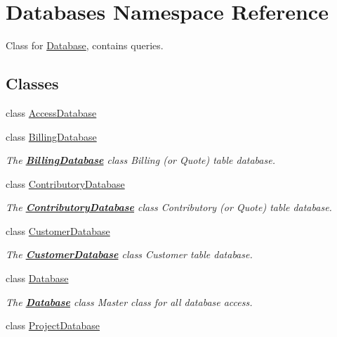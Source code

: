 \hypertarget{namespaceDatabases}{\section{Databases Namespace Reference}
\label{namespaceDatabases}
}


Class for \hyperlink{classDatabases_1_1Database}{Database}, contains queries.  


\subsection*{Classes}
\begin{DoxyCompactItemize}
\item 
class \hyperlink{classDatabases_1_1AccessDatabase}{Access\-Database}
\item 
class \hyperlink{classDatabases_1_1BillingDatabase}{Billing\-Database}
\begin{DoxyCompactList}\small\item\em The {\bfseries \hyperlink{classDatabases_1_1BillingDatabase}{Billing\-Database}} class Billing (or Quote) table database. \end{DoxyCompactList}\item 
class \hyperlink{classDatabases_1_1ContributoryDatabase}{Contributory\-Database}
\begin{DoxyCompactList}\small\item\em The {\bfseries \hyperlink{classDatabases_1_1ContributoryDatabase}{Contributory\-Database}} class Contributory (or Quote) table database. \end{DoxyCompactList}\item 
class \hyperlink{classDatabases_1_1CustomerDatabase}{Customer\-Database}
\begin{DoxyCompactList}\small\item\em The {\bfseries \hyperlink{classDatabases_1_1CustomerDatabase}{Customer\-Database}} class Customer table database. \end{DoxyCompactList}\item 
class \hyperlink{classDatabases_1_1Database}{Database}
\begin{DoxyCompactList}\small\item\em The {\bfseries \hyperlink{classDatabases_1_1Database}{Database}} class Master class for all database access. \end{DoxyCompactList}\item 
class \hyperlink{classDatabases_1_1ProjectDatabase}{Project\-Database}

\end{DoxyCompactItemize}
